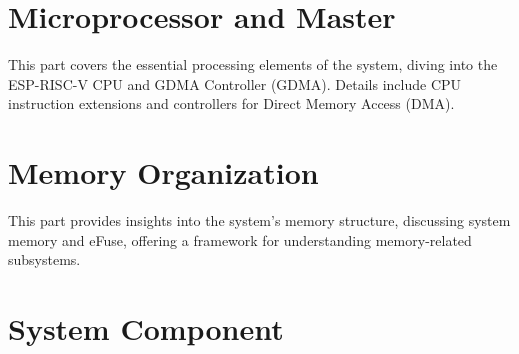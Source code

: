 \documentclass[openany, 10pt]{book}
\begin{document}
\setenglishformatting


\clearpage

\clearpage


\tableofcontents
\clearpage
\listoftables
\clearpage
\listoffigures






\part{Microprocessor and Master}


This part covers the essential processing elements of the system, diving into the ESP-RISC-V CPU and GDMA Controller (GDMA). Details include CPU instruction extensions and controllers for Direct Memory Access (DMA).



\part{Memory Organization}

This part provides insights into the system's memory structure, discussing system memory and eFuse, offering a framework for understanding memory-related subsystems.





\part{System Component}
\end{document}
